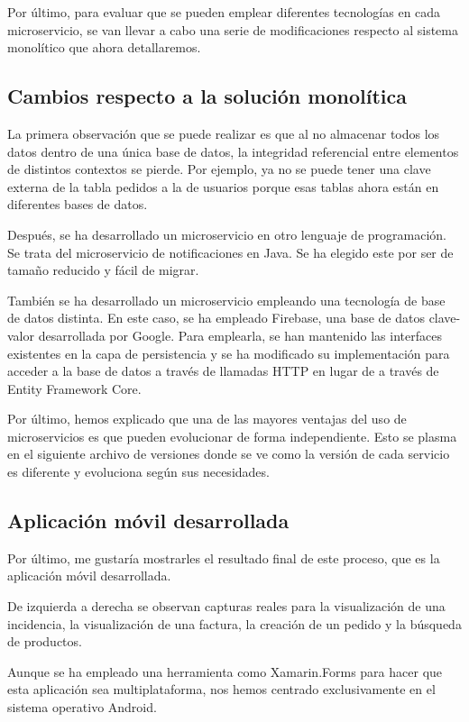 \documentclass[11pt,a4paper]{article}
\begin{document}
Por último, para evaluar que se pueden emplear diferentes tecnologías en cada microservicio, se van llevar a cabo una serie de modificaciones respecto al sistema monolítico que ahora detallaremos.

\subsection{Cambios respecto a la solución monolítica}

La primera observación que se puede realizar es que al no almacenar todos los datos dentro de una única base de datos, la integridad referencial entre elementos de distintos contextos se pierde. Por ejemplo, ya no se puede tener una clave externa de la tabla pedidos a la de usuarios porque esas tablas ahora están en diferentes bases de datos.

Después, se ha desarrollado un microservicio en otro lenguaje de programación. Se trata del microservicio de notificaciones en Java. Se ha elegido este por ser de tamaño reducido y fácil de migrar.

También se ha desarrollado un microservicio empleando una tecnología de base de datos distinta. En este caso, se ha empleado Firebase, una base de datos clave-valor desarrollada por Google. Para emplearla, se han mantenido las interfaces existentes en la capa de persistencia y se ha modificado su implementación para acceder a la base de datos a través de llamadas HTTP en lugar de a través de Entity Framework Core.

Por último, hemos explicado que una de las mayores ventajas del uso de microservicios es que pueden evolucionar de forma independiente. Esto se plasma en el siguiente archivo de versiones donde se ve como la versión de cada servicio es diferente y evoluciona según sus necesidades.

\subsection{Aplicación móvil desarrollada}

Por último, me gustaría mostrarles el resultado final de este proceso, que es la aplicación móvil desarrollada.

De izquierda a derecha se observan capturas reales para la visualización de una incidencia, la visualización de una factura, la creación de un pedido y la búsqueda de productos.

Aunque se ha empleado una herramienta como Xamarin.Forms para hacer que esta aplicación sea multiplataforma, nos hemos centrado exclusivamente en el sistema operativo Android.
\end{document}
